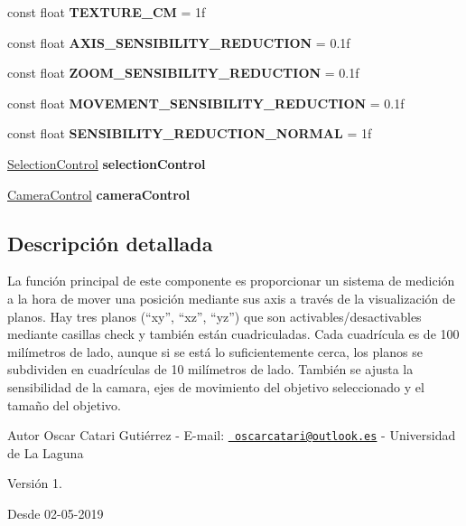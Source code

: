 \begin{DoxyCompactItemize}
const float {\bfseries T\+E\+X\+T\+U\+R\+E\+\_\+CM} = 1f
\item 
\mbox{\label{class_metric_system_control_a9db04ec2771e361c45bb0fd754ae5713}} 
const float {\bfseries A\+X\+I\+S\+\_\+\+S\+E\+N\+S\+I\+B\+I\+L\+I\+T\+Y\+\_\+\+R\+E\+D\+U\+C\+T\+I\+ON} = 0.\+1f
\item 
\mbox{\label{class_metric_system_control_a55765b790738a6a425bc7d9419768966}} 
const float {\bfseries Z\+O\+O\+M\+\_\+\+S\+E\+N\+S\+I\+B\+I\+L\+I\+T\+Y\+\_\+\+R\+E\+D\+U\+C\+T\+I\+ON} = 0.\+1f
\item 
\mbox{\label{class_metric_system_control_a09bb535f3f0dc3a0148aae3127cac3aa}} 
const float {\bfseries M\+O\+V\+E\+M\+E\+N\+T\+\_\+\+S\+E\+N\+S\+I\+B\+I\+L\+I\+T\+Y\+\_\+\+R\+E\+D\+U\+C\+T\+I\+ON} = 0.\+1f
\item 
\mbox{\label{class_metric_system_control_a96682b2e978aed50d76d421ec2e32930}} 
const float {\bfseries S\+E\+N\+S\+I\+B\+I\+L\+I\+T\+Y\+\_\+\+R\+E\+D\+U\+C\+T\+I\+O\+N\+\_\+\+N\+O\+R\+M\+AL} = 1f
\item 
\mbox{\label{class_metric_system_control_a45a8cce245251be2e23e7d2aae47148f}} 
\mbox{\hyperlink{class_selection_control}{Selection\+Control}} {\bfseries selection\+Control}
\item 
\mbox{\label{class_metric_system_control_a07ba2765128276abd787a07740080c41}} 
\mbox{\hyperlink{class_camera_control}{Camera\+Control}} {\bfseries camera\+Control}
\end{DoxyCompactItemize}


\subsection{Descripción detallada}
La función principal de este componente es proporcionar un sistema de medición a la hora de mover una posición mediante sus axis a través de la visualización de planos. Hay tres planos (“xy”, “xz”, “yz”) que son activables/desactivables mediante casillas check y también están cuadriculadas. Cada cuadrícula es de 100 milímetros de lado, aunque si se está lo suficientemente cerca, los planos se subdividen en cuadrículas de 10 milímetros de lado. También se ajusta la sensibilidad de la camara, ejes de movimiento del objetivo seleccionado y el tamaño del objetivo. \begin{DoxyAuthor}{Autor}
Oscar Catari Gutiérrez -\/ E-\/mail\+: \href{mailto:oscarcatari@outlook.es}{\texttt{ oscarcatari@outlook.\+es}} -\/ Universidad de La Laguna 
\end{DoxyAuthor}
\begin{DoxyVersion}{Versión}
1. 
\end{DoxyVersion}
\begin{DoxySince}{Desde}
02-\/05-\/2019 
\end{DoxySince}


